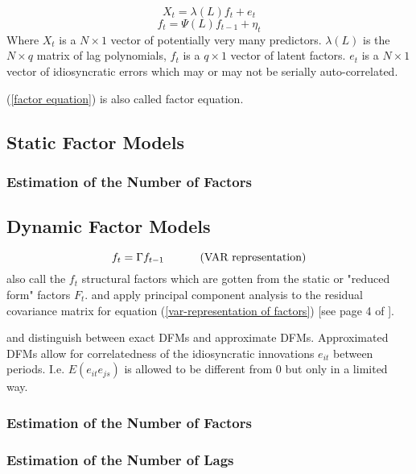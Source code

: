 \documentclass[11pt]{article}
\begin{document}
\begin{equation}
	\label{factor equation, lag polynomial}
	X_t = \lambda(L) f_t + e_t
\end{equation}
\begin{equation}
	f_t = \Psi(L) f_{t-1} + \eta_t
\end{equation}
Where $X_t$ is a $N \times 1$ vector of potentially very many predictors. $\lambda(L)$ is the $N \times q$ matrix of lag polynomials, $f_t$ is a $q \times 1$ vector of latent factors. $e_t$ is a $N \times 1$ vector of idiosyncratic errors which may or may not be serially auto-correlated.

(\ref{factor equation}) is also called factor equation.


\subsection{Static Factor Models}
\subsubsection{Estimation of the Number of Factors}
\subsection{Dynamic Factor Models}
\begin{equation}
	\label{var-representation of factors}
	f_t = \Gamma f_{t-1} \text{\hspace{1cm} (VAR representation)}
\end{equation}
\citet{breitung2004identification} also call the $f_t$ structural factors which are gotten from the static or "reduced form" factors $F_t$.
\citet{giannone2002tracking} and \citet{forni2009opening} apply principal component analysis to the residual covariance matrix for equation (\ref{var-representation of factors}) [see page 4 of \citet{breitung2004identification}].

\citet{geweke1977dynamic} and \citet{sargent1977business} distinguish between exact DFMs and approximate DFMs. Approximated DFMs allow for correlatedness of the idiosyncratic innovations $e_{it}$ between periods. I.e. $E(e_{it}e_{js})$ is allowed to be different from $0$ but only in a limited way.


\subsubsection{Estimation of the Number of Factors}
\subsubsection{Estimation of the Number of Lags}
\citep{breitung2004identification}
\end{document}
